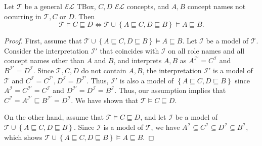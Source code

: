 \begin{lemma}
	Let $\mathcal{T}$ be a general $\mathcal{EL}$ TBox, $C,D$ $\mathcal{EL}$ concepts,
	and $A,B$ concept names not occurring in $\mathcal{T}, C$ or $D$.
	Then
	\[
	\mathcal{T} \vDash C \sqsubseteq D \iff \mathcal{T} \cup \left\{ A \sqsubseteq C, D \sqsubseteq B \right\} \vDash A \sqsubseteq B
	.\]
\end{lemma}
\begin{proof}
	First, assume that $\mathcal{T} \cup \left\{ A \sqsubseteq C, D \sqsubseteq B \right\} \vDash A \sqsubseteq B$.
	Let $\mathcal{I}$ be a model of $\mathcal{T}$.
	Consider the interpretation $\mathcal{I}'$ that coincides with $\mathcal{I}$ on all role names
	and all concept names other than  $A$ and $B$,
	and interprets $A,B$ as $A^{\mathcal{I}'} = C^\mathcal{I}$ and $B^{\mathcal{I}'} = D^\mathcal{I}$.
	Since $\mathcal{T}, C, D$ do not contain $A, B$,
	the interpretation $\mathcal{I}'$ is a model of $\mathcal{T}$ and
	$C^\mathcal{I} = C^{\mathcal{I}'}, D^{\mathcal{I}} = D^{\mathcal{I}'}$.
	Thus, $\mathcal{I}'$ is also a model of $\left\{ A \sqsubseteq C, D \sqsubseteq B \right\}$
	since $A^\mathcal{I} = C^{\mathcal{I}'} = C^\mathcal{I}$
	and $D^{\mathcal{I}'} = D^\mathcal{I} = B^\mathcal{I}$.
	Thus, our assumption implies that $C^\mathcal{I} = A^{\mathcal{I}'} \sqsubseteq B^{\mathcal{I}'} = D^\mathcal{I}$.
	We have shown that $\mathcal{T} \vDash C \sqsubseteq D$.

	On the other hand, assume that $\mathcal{T} \vDash C \sqsubseteq D$,
	and let $\mathcal{I}$ be a model of $\mathcal{T} \cup \left\{ A \sqsubseteq C, D \sqsubseteq B \right\}$.
	Since $\mathcal{I}$ is a model of $\mathcal{T}$, we have $A^\mathcal{I} \subseteq C^\mathcal{I} \subseteq D^\mathcal{I} \subseteq B^\mathcal{I}$,
	which shows $\mathcal{T} \cup \left\{ A \sqsubseteq C, D \sqsubseteq B \right\} \vDash A \sqsubseteq B$.
\end{proof}


